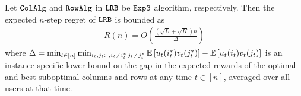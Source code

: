 
\begin{theorem}
\label{thm:upper bound} Let ${\tt ColAlg}$ and ${\tt RowAlg}$ in ${\tt LRB}$ be ${\tt Exp3}$ algorithm, respectively. Then the expected $n$-step regret of ${\tt LRB}$ is bounded as
\begin{align*}
  R(n) = O\left(\frac{\left(\sqrt{L } + \sqrt{K }\right)n}{\Delta}\right)
\end{align*}
where $\Delta = \min_{t \in [n]} \min_{i_t,j_t:\ , i_t \neq i^*_t \, j_t \neq j^*_t} \mathbb{E}\left[u_t(i^*_t)v_t(j^*_t)\right] - \mathbb{E}\left[u_t(i_t)v_t(j_t)\right]$ is an instance-specific lower bound on the gap in the expected rewards of the optimal and best suboptimal columns and rows at any time $t \in [n]$, averaged over all users at that time.  


\end{theorem}
